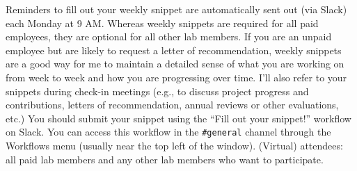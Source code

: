 \documentclass{tufte-book} %
\begin{document}
\begin{itemize}
Reminders to fill out your weekly snippet are automatically sent out (via
Slack) each Monday at 9 AM. Whereas weekly snippets are required for all paid
employees, they are optional for all other lab members. If you are an unpaid
employee but are likely to request a letter of recommendation, weekly snippets
are a good way for me to maintain a detailed sense of what you are working on
from week to week and how you are progressing over time. I'll also refer to
your snippets during check-in meetings (e.g., to discuss project progress and
contributions, letters of recommendation, annual reviews or other evaluations,
etc.) You should submit your snippet using the ``Fill out your snippet!''
workflow on Slack. You can access this workflow in the \texttt{\#general}
channel through the Workflows menu (usually near the top left of the window).
(Virtual) attendees: all paid lab members and any other lab members who want to
participate. 
\end{itemize}

{}
\end{document}
